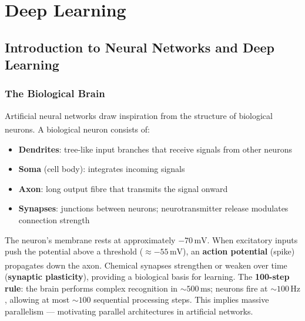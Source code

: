     \chapter{Deep Learning}

\section{Introduction to Neural Networks and Deep Learning}

\subsection{The Biological Brain}

\begin{tcbitemize}[ skin=sectionraster ]
    \tcbitem[title={The Biological Neuron}, raster multicolumn=3]
    Artificial neural networks draw inspiration from the structure of biological neurons\textsuperscript{\cite[][pp.~27--35]{Kriesel2007NeuralNetworks}}.
    A biological neuron consists of:
    \begin{itemize}
        \item \textbf{Dendrites}: tree-like input branches that receive signals from other neurons
        \item \textbf{Soma} (cell body): integrates incoming signals
        \item \textbf{Axon}: long output fibre that transmits the signal onward
        \item \textbf{Synapses}: junctions between neurons; neurotransmitter release modulates connection strength
    \end{itemize}

    \tcbitem[title={From Biology to Computation}, raster multicolumn=3]
    The neuron's membrane rests at approximately $-70\,\text{mV}$.
    When excitatory inputs push the potential above a threshold ($\approx -55\,\text{mV}$), an \textbf{action potential} (spike) propagates down the axon\textsuperscript{\cite[][pp.~29--31]{Kriesel2007NeuralNetworks}}.
    Chemical synapses strengthen or weaken over time (\textbf{synaptic plasticity}), providing a biological basis for learning.
    \tcblower
    The \textbf{100-step rule}: the brain performs complex recognition in ${\sim}500\,\text{ms}$; neurons fire at ${\sim}100\,\text{Hz}$, allowing at most ${\sim}100$ sequential processing steps.
    This implies massive parallelism --- motivating parallel architectures in artificial networks.
\end{tcbitemize}

